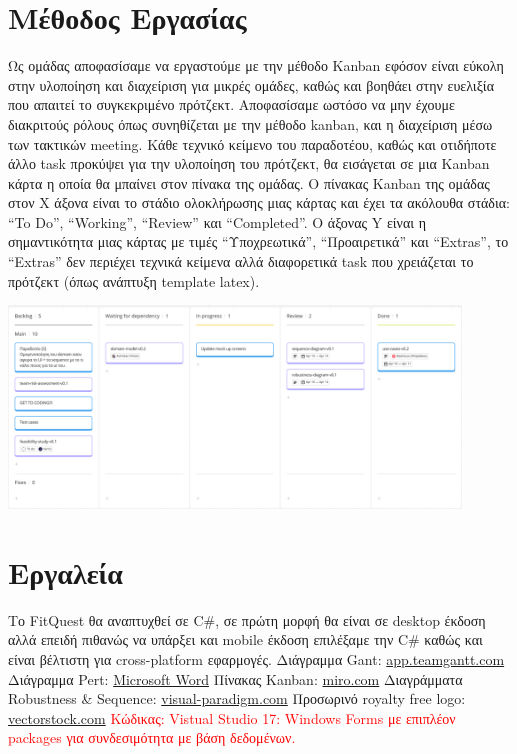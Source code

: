 \documentclass{article}
\begin{document}
\section{Μέθοδος Εργασίας}
Ως ομάδας αποφασίσαμε να εργαστούμε με την μέθοδο Kanban εφόσον είναι εύκολη στην υλοποίηση και διαχείριση για μικρές ομάδες, καθώς και βοηθάει στην ευελιξία που απαιτεί το συγκεκριμένο πρότζεκτ. Αποφασίσαμε ωστόσο να μην έχουμε διακριτούς ρόλους όπως συνηθίζεται με την μέθοδο kanban, και η διαχείριση μέσω των τακτικών meeting. Κάθε τεχνικό κείμενο του παραδοτέου, καθώς και οτιδήποτε άλλο task προκύψει για την υλοποίηση του πρότζεκτ, θα εισάγεται σε μια Kanban κάρτα η οποία θα μπαίνει στον πίνακα της ομάδας. 
Ο πίνακας Kanban της ομάδας στον X άξονα είναι το στάδιο ολοκλήρωσης μιας κάρτας και έχει τα ακόλουθα στάδια: “To Do”, “Working”, “Review” και “Completed”. O άξονας Y είναι η σημαντικότητα μιας κάρτας με τιμές “Υποχρεωτικά”, “Προαιρετικά” και “Extras”, το “Extras” δεν περιέχει τεχνικά κείμενα αλλά διαφορετικά task που χρειάζεται το πρότζεκτ (όπως ανάπτυξη template latex).

\vspace{20px}
\begin{center}
   \includegraphics[width=0.9\textwidth]{kanban.png}
\end{center}

\section{Εργαλεία}
Το FitQuest θα αναπτυχθεί σε C\#, σε πρώτη μορφή θα είναι σε desktop έκδοση αλλά επειδή πιθανώς να υπάρξει και mobile έκδοση επιλέξαμε την C\# καθώς και είναι βέλτιστη για cross-platform εφαρμογές.\newline
Διάγραμμα Gant: \href{https://app.teamgantt.com}{app.teamgantt.com}\newline
Διάγραμμα Pert: \href{https://www.microsoft.com/el-gr/microsoft-365/word}{Microsoft Word}\newline
Πίνακας Kanban: \href{www.miro.com}{miro.com}\newline
Διαγράμματα Robustness \& Sequence: \href{https://www.visual-paradigm.com}{visual-paradigm.com}\newline
Προσωρινό royalty free logo: \href{https://www.Vectorstock.com/royalty-free-vector/rpg-creative-icon-from-gaming-icons-collection-vector-45969591}{vectorstock.com}\newline
 \textcolor{red}{Κώδικας: Vistual Studio 17: Windows Forms με επιπλέον packages για συνδεσιμότητα με βάση δεδομένων.}
\end{document}
